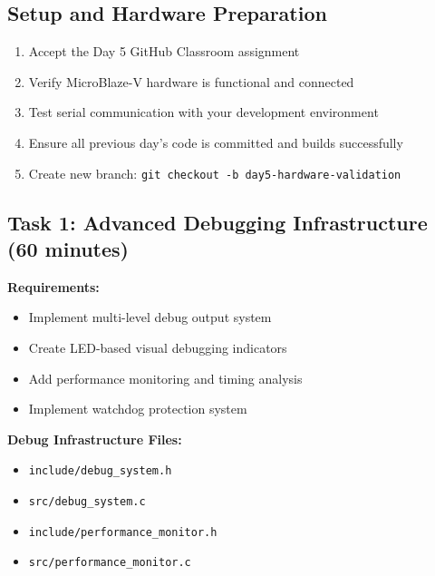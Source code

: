 \documentclass[11pt,a4paper]{article}
\begin{document}
\subsection{Setup and Hardware Preparation}
\begin{enumerate}
    \item Accept the Day 5 GitHub Classroom assignment
    \item Verify MicroBlaze-V hardware is functional and connected
    \item Test serial communication with your development environment
    \item Ensure all previous day's code is committed and builds successfully
    \item Create new branch: \texttt{git checkout -b day5-hardware-validation}
\end{enumerate}

\subsection{Task 1: Advanced Debugging Infrastructure (60 minutes)}

\textbf{Requirements:}
\begin{itemize}
    \item Implement multi-level debug output system
    \item Create LED-based visual debugging indicators
    \item Add performance monitoring and timing analysis
    \item Implement watchdog protection system
\end{itemize}

\textbf{Debug Infrastructure Files:}
\begin{itemize}
    \item \texttt{include/debug\_system.h}
    \item \texttt{src/debug\_system.c}
    \item \texttt{include/performance\_monitor.h}
    \item \texttt{src/performance\_monitor.c}
\end{itemize}
\end{document}
